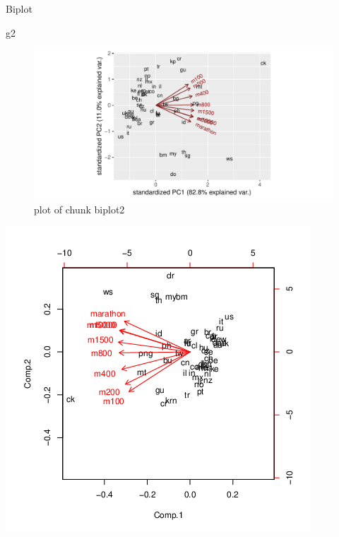 \documentclass[ignorenonframetext,]{beamer}
\newenvironment{Shaded}{\begin{snugshade}}{\end{snugshade}}
\newcommand{\NormalTok}[1]{#1}
\begin{document}
\begin{frame}[fragile]{Biplot}
\protect\hypertarget{biplot-3}{}

\begin{Shaded}
\begin{Highlighting}[]
\NormalTok{g2}
\end{Highlighting}
\end{Shaded}

\begin{figure}
\centering
\includegraphics{figure/biplot2-1.pdf}
\caption{plot of chunk biplot2}
\end{figure}

\includegraphics{bPrincomp-biplot.png}

\end{frame}
\end{document}
